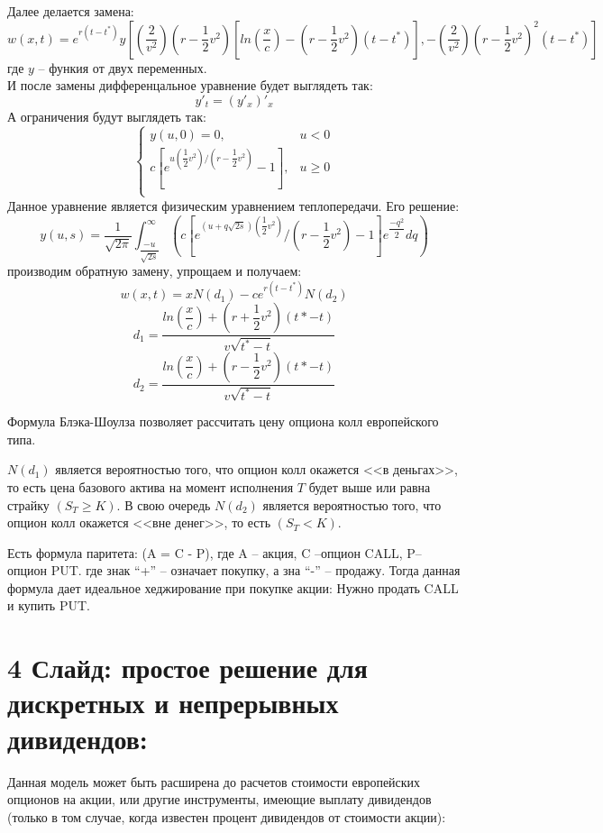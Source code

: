 \documentclass[a4paper]{article}
\begin{document}
Далее делается замена: \\
\[ w(x,t) = e^{r (t - t^*)} y \left[ \left(\frac{2}{v^2} \right) \left( r - \dfrac{1}{2} v^2\right) \left[ ln(\dfrac{x}{c}) - \left( r - \dfrac{1}{2} v^2 \right) (t - t^*) \right], - \left( \dfrac{2}{v^2} \right) \left( r - \dfrac{1}{2} v^2 \right)^2 (t - t^*) \right] \]
где $y$ -- функия от двух переменных. \\
И после замены дифференцальное уравнение будет выглядеть так:
\[y'_t = (y'_x)'_x\]
А ограничения будут выглядеть так:
\begin{equation*}
    \begin{cases}
        y(u, 0) = 0, &u < 0\\
        c \left[ e^{u \left( \dfrac{1}{2} v^2\right) / \left( r - \dfrac{1}{2} v^2\right)} - 1 \right], &u \geq 0 \\
    \end{cases}
\end{equation*}
Данное уравнение является физическим уравнением теплопередачи. Его решение:
\[y(u, s) = \dfrac{1}{\sqrt{2 \pi}} \int_{\dfrac{-u}{\sqrt{2s}}}^{\infty} \left( c \left[ e^{(u + q \sqrt{2s}) \left( \dfrac{1}{2} v^2 \right)} / \left( r - \dfrac{1}{2} v^2\right) - 1 \right] e^{\dfrac{-q^2}{2}} dq \right) \] 
производим обратную замену, упрощаем и получаем:
\[ w(x, t) = x N(d_1) - ce^{r (t - t^*)} N(d_2) \]
\[ d_1 = \dfrac{ln \left(\dfrac{x}{c} \right) + \left( r + \dfrac{1}{2} v^2 \right) (t* - t)}{v \sqrt{t^* - t}}\]
\[ d_2 = \dfrac{ln \left(\dfrac{x}{c} \right) + \left( r - \dfrac{1}{2} v^2 \right) (t* - t)}{v \sqrt{t^* - t}}\]

Формула Блэка-Шоулза позволяет рассчитать цену опциона колл европейского типа.

$N(d_1)$ является вероятностью того, что опцион колл окажется <<в деньгах>>, то есть цена базового актива на момент исполнения $T$ будет выше или равна страйку $(S_T \geq K)$. В свою очередь $N(d_2)$ является вероятностью того, что опцион колл окажется <<вне денег>>, то есть $(S_T < K)$.

Есть формула паритета: (A = C - P), где A -- акция, C --опцион CALL, P-- опцион PUT. где знак “+” -- означает покупку, а зна “-” -- продажу.
Тогда данная формула дает идеальное хеджирование при покупке акции:
Нужно продать CALL и купить PUT.

\section*{4 Слайд: простое решение для дискретных и непрерывных дивидендов:}
Данная модель может быть расширена до расчетов стоимости европейских опционов на акции, или другие инструменты, имеющие выплату дивидендов (только в том случае, когда известен процент дивидендов от стоимости акции):
\end{document}
